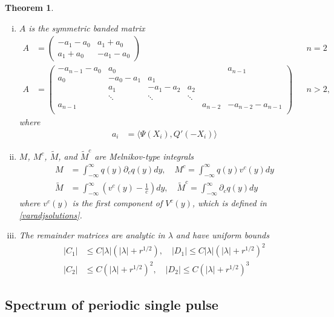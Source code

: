 \documentclass[10pt,reqno]{amsart}
\theoremstyle{plain}
\newtheorem{theorem}{Theorem}
\theoremstyle{definition}
\theoremstyle{remark}
\numberwithin{theorem}{section}
\numberwithin{equation}{section}
\begin{document}
\begin{theorem}
\begin{enumerate}[(i)]
\item $A$ is the symmetric banded matrix
\begin{align}\label{Asymm}
A &= \begin{pmatrix}
-a_1 - a_0 & a_1 + a_0 \\
a_1 + a_0 & - a_1 - a_0 
\end{pmatrix} && n = 2 \\
A &= \begin{pmatrix}
-a_{n-1} - a_0 & a_0 & & &  & a_{n-1}\\
a_0 & -a_0 - a_1 &  a_1 \\
& a_1 & -a_1 - a_2 &  a_2 \\
& \ddots & \ddots & \ddots \\
a_{n-1} & & & & a_{n-2} & -a_{n-2} - a_{n-1} \\
\end{pmatrix} && n > 2,
\end{align}
where
\begin{align*}
a_i &= \langle \Psi(X_i), Q'(-X_i) \rangle
\end{align*}

\item $M$, $M^c$, $\tilde{M}$, and $\tilde{M}^c$ are  Melnikov-type integrals
\begin{align*}
M &= \int_{-\infty}^\infty q(y) \partial_c q(y) dy, \quad
M^c = \int_{-\infty}^\infty q(y) v^c(y) dy \\
\tilde{M} &= \int_{-\infty}^{\infty} \left(v^c(y) - \frac{1}{c}\right) dy, \quad
\tilde{M}^c = \int_{-\infty}^\infty \partial_c q(y) dy
\end{align*}
where $v^c(y)$ is the first component of $V^c(y)$, which is defined in \cref{varadjsolutions}.

\item The remainder matrices are analytic in $\lambda$ and have uniform bounds
\begin{align*}
|C_1| &\leq C |\lambda|(|\lambda| + r^{1/2}), \quad
|D_1| \leq C |\lambda|(|\lambda| + r^{1/2})^2 \\
|C_2| &\leq C (|\lambda| + r^{1/2})^2, \quad
|D_2| \leq C (|\lambda| + r^{1/2})^3 
\end{align*}
\end{enumerate}
\end{theorem}

\subsection{Spectrum of periodic single pulse}\label{sec:persingle}
\end{document}
